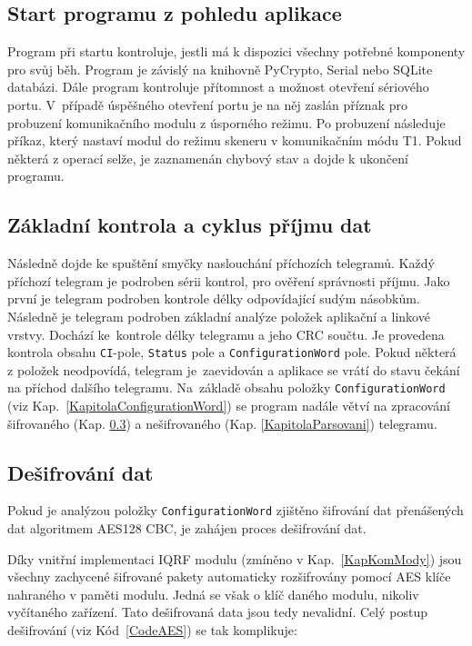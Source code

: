 \subsection{Start programu z pohledu aplikace}
Program při startu kontroluje, jestli  má k dispozici všechny potřebné komponenty pro svůj běh. Program je závislý na knihovně PyCrypto, Serial nebo SQLite databázi.
Dále program kontroluje přítomnost a možnost otevření sériového portu. V~případě úspěšného otevření portu je na něj zaslán příznak pro probuzení komunikačního modulu z úsporného režimu. Po probuzení následuje příkaz, který nastaví modul do režimu skeneru v komunikačním módu T1. Pokud některá z operací selže, je zaznamenán chybový stav a dojde k ukončení programu.

\subsection{Základní kontrola a cyklus příjmu dat}
Následně dojde ke spuštění smyčky naslouchání příchozích telegramů. Každý příchozí telegram je podroben sérii kontrol, pro ověření správnosti příjmu. Jako první je telegram podroben kontrole délky odpovídající sudým násobkům. Následně je telegram podroben základní analýze položek aplikační a linkové vrstvy. Dochází ke~kontrole délky telegramu a jeho CRC součtu. Je provedena kontrola obsahu \texttt{CI}-pole, \texttt{Status} pole a \texttt{ConfigurationWord} pole. Pokud některá z položek neodpovídá, telegram je~zaevidován a aplikace se vrátí do stavu čekání na příchod dalšího telegramu.
Na~základě obsahu položky \texttt{ConfigurationWord} (viz Kap.~\ref{KapitolaConfigurationWord}) se program nadále větví na zpracování šifrovaného (Kap. \ref{KapitolaDesifrovani}) a nešifrovaného (Kap. \ref{KapitolaParsovani}) telegramu.

\subsection{Dešifrování dat}
\label{KapitolaDesifrovani}
Pokud je analýzou položky \texttt{ConfigurationWord} zjištěno šifrování dat přenášených dat algoritmem AES128 CBC, je zahájen proces dešifrování dat.

Díky vnitřní implementaci IQRF modulu (zmíněno v Kap.~\ref{KapKomMody}) jsou všechny zachycené šifrované pakety automaticky rozšifrovány pomocí AES klíče nahraného v paměti modulu. Jedná se však o klíč daného modulu, nikoliv vyčítaného zařízení. Tato dešifrovaná data jsou tedy nevalidní. Celý postup dešifrování (viz Kód~\ref{CodeAES}) se tak komplikuje:

